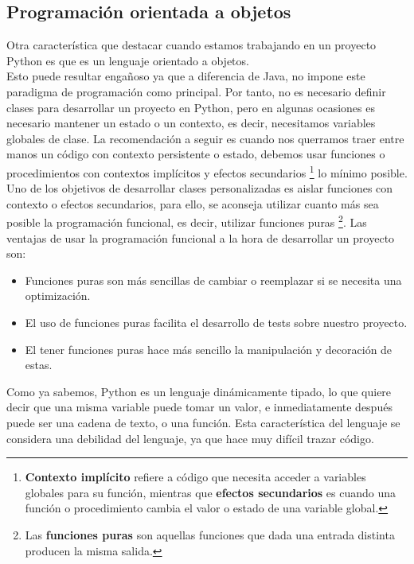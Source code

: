 \subsection*{Programación orientada a objetos}
Otra característica que destacar cuando estamos trabajando en un proyecto Python es que es un lenguaje orientado a objetos. \\
Esto puede resultar engañoso ya que a diferencia de Java, no impone este paradigma de programación como principal. Por tanto, no es necesario definir clases para desarrollar un proyecto en Python, pero en algunas ocasiones es necesario mantener un estado o un contexto, es decir, necesitamos variables globales de clase. La recomendación a seguir es cuando nos querramos traer entre manos un código con contexto persistente o estado, debemos usar funciones o procedimientos con contextos implícitos y efectos secundarios \footnote{\textbf{Contexto implícito} refiere a código que necesita acceder a variables globales para su función, mientras que \textbf{efectos secundarios} es cuando una función o procedimiento cambia el valor  o estado de una variable global. } lo mínimo posible. Uno de los objetivos de desarrollar clases personalizadas es aislar funciones con contexto o efectos secundarios, para ello, se aconseja utilizar cuanto más sea posible la programación funcional, es decir, utilizar funciones puras \footnote{Las \textbf{funciones puras} son aquellas funciones que dada una entrada distinta producen la misma salida.}. Las ventajas de usar la programación funcional  a la hora de desarrollar un proyecto son:
\begin{itemize}
    \item Funciones puras son más sencillas de cambiar o reemplazar si se necesita una optimización.
    \item El uso de funciones puras facilita el desarrollo de tests sobre nuestro proyecto.
    \item El tener funciones puras hace más sencillo la manipulación y decoración de estas.
\end{itemize}
Como ya sabemos, Python es un lenguaje dinámicamente tipado, lo que quiere decir que una misma variable puede tomar un valor, e inmediatamente después puede ser una cadena de texto, o una función. Esta característica del lenguaje se considera una debilidad del lenguaje, ya que hace muy difícil trazar código.\\

